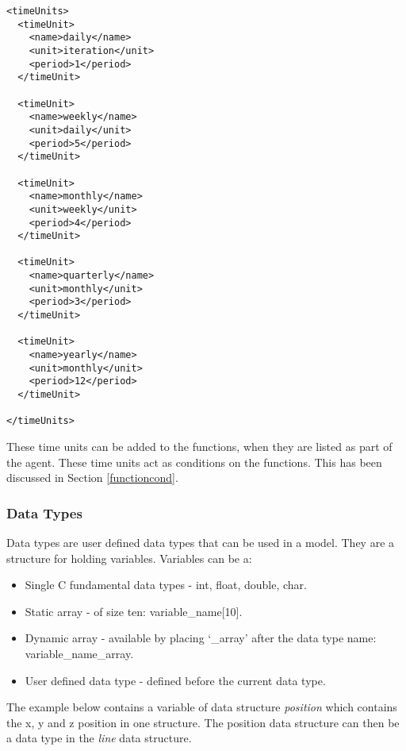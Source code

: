 \begin{mylisting}
\begin{verbatim}
<timeUnits>
  <timeUnit>
    <name>daily</name>
    <unit>iteration</unit>
    <period>1</period>
  </timeUnit>

  <timeUnit>
    <name>weekly</name>
    <unit>daily</unit>
    <period>5</period>
  </timeUnit>

  <timeUnit>
    <name>monthly</name>
    <unit>weekly</unit>
    <period>4</period>
  </timeUnit>

  <timeUnit>
    <name>quarterly</name>
    <unit>monthly</unit>
    <period>3</period>
  </timeUnit>

  <timeUnit>
    <name>yearly</name>
    <unit>monthly</unit>
    <period>12</period>
  </timeUnit>

</timeUnits>
\end{verbatim}
\end{mylisting}

These time units can be added to the functions, when they are listed as part of the agent. These time units act as conditions on the functions. This has been discussed in Section \ref{functioncond}.

\subsubsection{Data Types}

Data types are user defined data types that can be used in a model. They are a
structure for holding variables. Variables can be a:

\begin{itemize}
  \item Single C fundamental data types - int, float, double, char.
  \item Static array - of size ten: variable\_name[10].
  \item Dynamic array - available by placing `\_array' after
  the data type name: variable\_name\_array.
  \item User defined data type - defined before the current data type.
\end{itemize}

The example below contains a variable
of data structure \emph{position} which contains the x, y and z position in one structure. The position data structure can then be a data type in the \emph{line} data structure.


